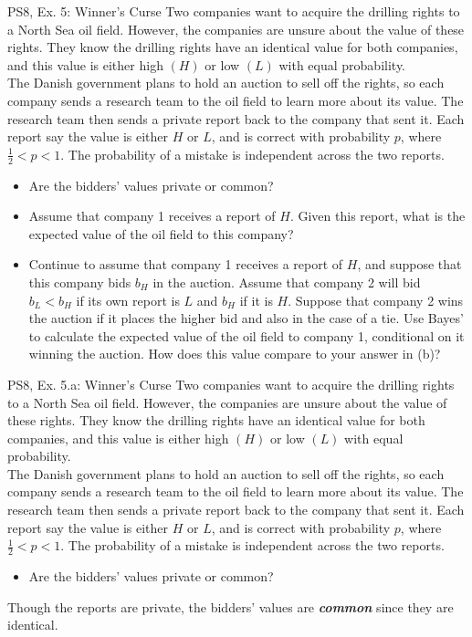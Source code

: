 \begin{frame}{PS8, Ex. 5: Winner's Curse}
      Two companies want to acquire the drilling rights to a North Sea oil field. However, the companies are unsure about the value of these rights. They know the drilling rights have an identical value for both companies, and this value is either high $(H)$ or low $(L)$ with equal probability.\\\medskip
      The Danish government plans to hold an auction to sell off the rights, so each company sends a research team to the oil field to learn more about its value. The research team then sends a private report back to the company that sent it. Each report say the value is either $H$ or $L$, and is correct with probability $p$, where $\frac{1}{2} < p < 1$. The probability of a mistake is independent across the two reports.
      \begin{itemize}
        \item[(a)] Are the bidders’ values private or common?
        \item[(b)] Assume that company 1 receives a report of $H$. Given this report, what is the expected value of the oil field to this company?
        \item[(c)] Continue to assume that company 1 receives a report of $H$, and suppose that this company bids $b_H$ in the auction. Assume that company 2 will bid $b_L < b_H$ if its own report is $L$ and $b_H$ if it is $H$. Suppose that company 2 wins the auction if it places the higher bid and also in the case of a tie. Use Bayes’ to calculate the expected value of the oil field to company 1, conditional on it winning the auction. How does this value compare to your answer in (b)?
      \end{itemize}
      \vfill\null
\end{frame}


\begin{frame}{PS8, Ex. 5.a: Winner's Curse}
    Two companies want to acquire the drilling rights to a North Sea oil field. However, the companies are unsure about the value of these rights. They know the drilling rights have an identical value for both companies, and this value is either high $(H)$ or low $(L)$ with equal probability.\\\medskip
    The Danish government plans to hold an auction to sell off the rights, so each company sends a research team to the oil field to learn more about its value. The research team then sends a private report back to the company that sent it. Each report say the value is either $H$ or $L$, and is correct with probability $p$, where $\frac{1}{2} < p < 1$. The probability of a mistake is independent across the two reports.
    \begin{itemize}
      \item[(a)] Are the bidders’ values private or common?
    \end{itemize}
    Though the reports are private, the bidders' values are \textit{\textbf{common}} since they are identical.
    \vfill\null
\end{frame}


